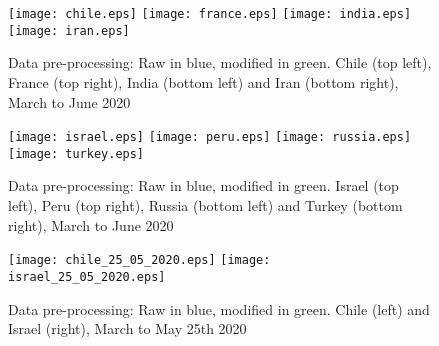 \documentclass{article}
\begin{document}
\begin{figure}[H]
\begin{center}
{\texttt{[image: chile.eps]}}
\qquad
{\texttt{[image: france.eps]}}
\qquad
{\texttt{[image: india.eps]}}
\qquad
{\texttt{[image: iran.eps]}}
\end{center}
\begin{center}
\caption{Data pre-processing: Raw in blue, modified in green. Chile (top left), France (top right), India (bottom left) and Iran (bottom right), March to June 2020
}
\label{fig:chile_france_india_iran_07_06_2020}
\end{center}
\end{figure}

\begin{figure}[H]
    \begin{center}
        {\texttt{[image: israel.eps]}}
        \qquad
        {\texttt{[image: peru.eps]}}
        \qquad
    {\texttt{[image: russia.eps]}}
    \qquad
    {\texttt{[image: turkey.eps]}}
    \end{center}
    \begin{center}
    \caption{Data pre-processing: Raw in blue, modified in green. Israel (top left), Peru (top right), Russia (bottom left) and Turkey (bottom right), March to June 2020
    }
\label{fig:israel_peru_russia_turkey_07_06_2020}
    \end{center}
\end{figure}


\begin{figure}[H]
    \begin{center}
        {\texttt{[image: chile\_25\_05\_2020.eps]}}
        \qquad
        {\texttt{[image: israel\_25\_05\_2020.eps]}}
    \end{center}
    \begin{center}
    \caption{Data pre-processing: Raw in blue, modified in green. Chile (left) and Israel (right), March to May 25th 2020
    }
\label{fig:chile_and_israel_25_05_2020}
    \end{center}
\end{figure}
\end{document}
